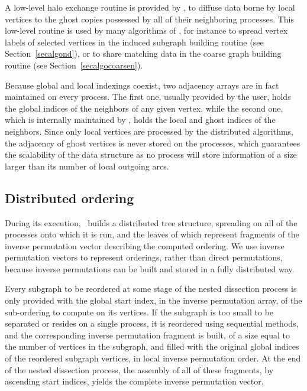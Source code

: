\documentclass[fleqn,12pt,twoside]{article}
\begin{document}
A low-level halo exchange routine is provided by \ptscotch, to diffuse
data borne by local vertices to the ghost copies possessed by all of
their neighboring processes. This low-level routine is used by many
algorithms of \ptscotch, for instance to spread vertex labels of
selected vertices in the induced subgraph building routine (see
Section~\ref{secalgond}), or to share matching data in the coarse graph
building routine (see Section~\ref{secalgocoarsen}).

Because global and local indexings coexist, two adjacency arrays are
in fact maintained on every process. The first one, usually provided
by the user, holds the global indices of the neighbors of any given
vertex, while the second one, which is internally maintained by \ptscotch,
holds the local and ghost indices of the neighbors.
Since only local vertices are processed by the distributed algorithms,
the adjacency of ghost vertices is never stored on the processes,
which guarantees the scalability of the data structure as no process
will store information of a size larger than its number of local
outgoing arcs.

\subsection{Distributed ordering}

During its execution, \ptscotch\ builds a distributed tree structure,
spreading on all of the processes onto which it is run, and the
leaves of which represent fragments of the inverse permutation vector
describing the computed ordering. We use inverse permutation vectors
to represent orderings, rather than direct permutations, because
inverse permutations can be built and stored in a fully distributed
way.

Every subgraph to be reordered at some stage of the nested dissection
process is only provided with the global start index, in the inverse
permutation array, of the sub-ordering to compute on its vertices. If
the subgraph is too small to be separated or resides on a single
process, it is reordered using sequential methods, and the
corresponding inverse permutation fragment is built, of a size equal
to the number of vertices in the subgraph, and filled with the
original global indices of the reordered subgraph vertices, in local
inverse permutation order.
At the end of the nested dissection process, the assembly of all of
these fragments, by ascending start indices, yields the complete
inverse permutation vector.
\end{document}
